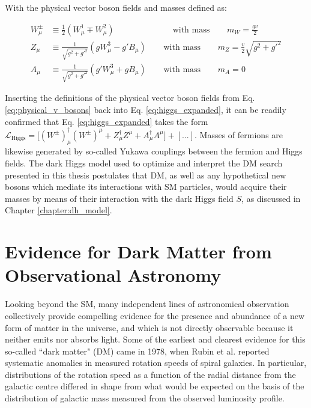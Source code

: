 With the physical vector boson fields and masses defined as:

\begin{equation}
\label{eq:physical_v_bosons}
\begin{split}
W^\pm_\mu & \equiv \frac{1}{2}(W_\mu^1 \mp W_\mu^2) \phantom{xxxxxxxxxlxx}\text{ with mass }\phantom{xxx} m_W=\frac{gv}{2} \\
Z_\mu & \equiv \frac{1}{\sqrt{g^2+g'^2}}(gW_\mu^3-g'B_\mu) \phantom{xxx}\text{ with mass }\phantom{xxx} m_Z = \frac{v}{2}\sqrt{g^2+g'^2} \\
A_\mu & \equiv \frac{1}{\sqrt{g^2+g'^2}}(g'W^3_\mu+gB_\mu) \phantom{xxx}\text{ with mass }\phantom{xxx} m_A = 0
\end{split}
\end{equation}

Inserting the definitions of the physical vector boson fields from Eq. \ref{eq:physical_v_bosons} back into Eq. \ref{eq:higgs_expanded}, it can be readily confirmed that Eq. \ref{eq:higgs_expanded} takes the form \(\mathcal{L}_\text{Higgs} = \big[(W^\pm)_\mu^\dagger(W^\pm)^\mu + Z_\mu^\dagger Z^\mu + A_\mu^\dagger A^\mu\big] + [...]\). Masses of fermions are likewise generated by so-called Yukawa couplings \cite{weinberg_1967} between the fermion and Higgs fields. The dark Higgs model used to optimize and interpret the DM search presented in this thesis postulates that DM, as well as any hypothetical new bosons which mediate its interactions with SM particles, would acquire their masses by means of their interaction with the dark Higgs field \(S\), as discussed in Chapter \ref{chapter:dh_model}. 


\section{Evidence for Dark Matter from Observational Astronomy}

Looking beyond the SM, many independent lines of astronomical observation collectively provide compelling evidence for the presence and abundance of a new form of matter in the universe, and which is not directly observable because it neither emits nor absorbs light. Some of the earliest and clearest evidence for this so-called ``dark matter" (DM) came in 1978, when Rubin et al. \cite{Rubin_et_al} reported systematic anomalies in measured rotation speeds of spiral galaxies. In particular, distributions of the rotation speed as a function of the radial distance from the galactic centre differed in shape from what would be expected on the basis of the distribution of galactic mass measured from the observed luminosity profile. 

